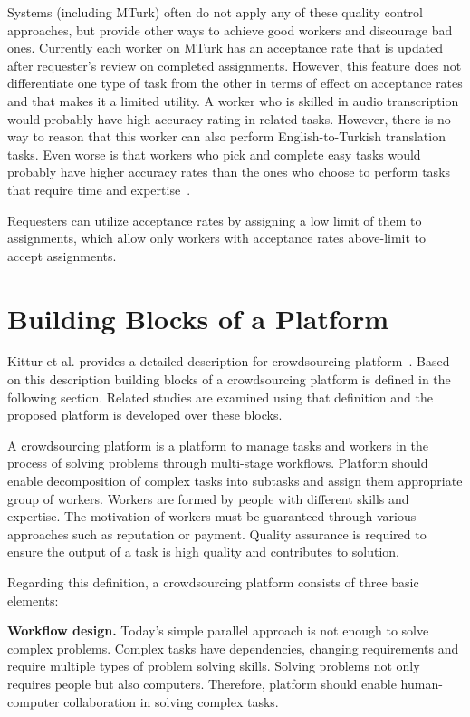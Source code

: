Systems (including MTurk) often do not apply any of these quality control approaches, 
but provide other ways to achieve good workers and discourage bad ones. 
Currently each worker on MTurk has an acceptance rate that is updated after 
requester's review on completed assignments. However, this feature does not 
differentiate one type of task from the other in terms of effect on acceptance rates 
and that makes it a limited utility. A worker who is skilled in audio transcription would 
probably have high accuracy rating in related tasks. However, there is no way to 
reason that this worker can also perform English-to-Turkish translation tasks. 
Even worse is that workers who pick and complete easy tasks would probably 
have higher accuracy rates than the ones who choose to perform tasks that 
require time and expertise~\cite{Barowy2012}.

Requesters can utilize acceptance rates by assigning a low limit of them to 
assignments, which allow only workers with acceptance rates above-limit 
to accept assignments.



\section{Building Blocks of a Platform}
Kittur et al. provides a detailed description for crowdsourcing platform~\cite{Kittur2013}. 
Based on this description building blocks of a crowdsourcing platform is defined in 
the following section. Related studies are examined using that definition and the 
proposed platform is developed over these blocks.

A crowdsourcing platform is a platform to manage tasks and workers in the 
process of solving problems through multi-stage workflows. Platform should enable 
decomposition of complex tasks into subtasks and assign them appropriate group of 
workers. Workers are formed by people with different skills and expertise. The motivation 
of workers must be guaranteed through various approaches 
such as reputation or payment. Quality assurance is required to ensure the output 
of a task is high quality and contributes to solution.

Regarding this definition, a crowdsourcing platform consists of three basic elements:

\textbf{Workflow design.} Today's simple parallel approach is not enough to solve 
complex problems. Complex tasks have dependencies, changing requirements and 
require multiple types of problem solving skills. Solving problems not only requires 
people but also computers. Therefore, platform should enable human-computer 
collaboration in solving complex tasks.

